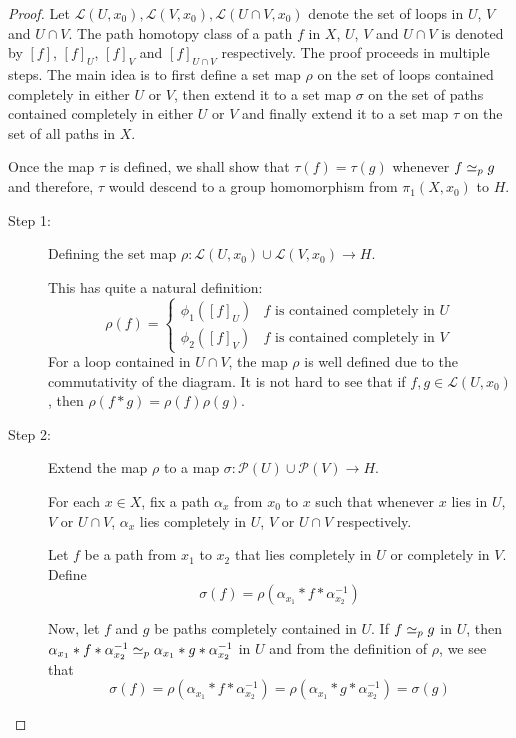 \begin{proof}
Let $\mathscr L(U,x_0), \mathscr L(V,x_0), \mathscr L(U\cap V, x_0)$ denote the set of loops in $U$, $V$ and $U\cap V$. The path homotopy class of a path $f$ in $X$, $U$, $V$ and $U\cap V$ is denoted by $[f]$, $[f]_U$, $[f]_V$ and $[f]_{U\cap V}$ respectively. The proof proceeds in multiple steps. The main idea is to first define a set map $\rho$ on the set of loops contained completely in either $U$ or $V$, then extend it to a set map $\sigma$ on the set of paths contained completely in either $U$ or $V$ and finally extend it to a set map $\tau$ on the set of all paths in $X$.

Once the map $\tau$ is defined, we shall show that $\tau(f) = \tau(g)$ whenever $f\simeq_p g$ and therefore, $\tau$ would descend to a group homomorphism from $\pi_1(X,x_0)$ to $H$.

\begin{description}
\item[Step 1:] Defining the set map $\rho:\mathscr L(U,x_0)\cup\mathscr L(V,x_0)\to H$.

This has quite a natural definition: 
\begin{equation*}
    \rho(f) = 
    \begin{cases}
        \phi_1([f]_U) & \text{$f$ is contained completely in $U$}\\
        \phi_2([f]_V) & \text{$f$ is contained completely in $V$}
    \end{cases}
\end{equation*}
For a loop contained in $U\cap V$, the map $\rho$ is well defined due to the commutativity of the diagram. It is not hard to see that if $f,g\in\mathscr L(U, x_0)$, then $\rho(f * g) = \rho(f)\rho(g)$.

\item[Step 2:] Extend the map $\rho$ to a map $\sigma:\mathscr P(U)\cup\mathscr P(V)\to H$.

For each $x\in X$, fix a path $\alpha_x$ from $x_0$ to $x$ such that whenever $x$ lies in $U$, $V$ or $U\cap V$, $\alpha_x$ lies completely in $U$, $V$ or $U\cap V$ respectively.

Let $f$ be a path from $x_1$ to $x_2$ that lies completely in $U$ or completely in $V$. Define 
\begin{equation*}
    \sigma(f) = \rho(\alpha_{x_1} * f * \alpha_{x_2}^{-1})
\end{equation*}

Now, let $f$ and $g$ be paths completely contained in $U$. If $f\simeq_p g$ in $U$, then $\alpha_{x_1} * f * \alpha_{x_2}^{-1}\simeq_p\alpha_{x_1} * g * \alpha_{x_2}^{-1}$ in $U$ and from the definition of $\rho$, we see that 
\begin{equation*}
    \sigma(f) = \rho(\alpha_{x_1} * f * \alpha_{x_2}^{-1}) = \rho(\alpha_{x_1} * g * \alpha_{x_2}^{-1}) = \sigma(g)
\end{equation*}


\end{description}
\end{proof}
